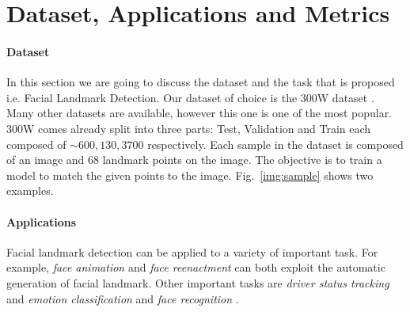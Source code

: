 \section{Dataset, Applications and Metrics}\label{sects:dataset}
\paragraph{Dataset}
In this section we are going to discuss the dataset and the task that is proposed i.e. Facial Landmark Detection. Our dataset of choice is the 300W dataset \cite{Sagonas13a,Sagonas13b,Sagonas16}. Many other datasets are available, however this one is one of the most popular. 300W comes already split into three parts: Test, Validation and Train each composed of $\sim 600,130,3700$ respectively. Each sample in the dataset is composed of an image and 68 landmark points on the image. The objective is to train a model to match the given points to the image. Fig.~\ref{img:sample} shows two examples.

\paragraph{Applications}
Facial landmark detection can be applied to a variety of important task. For example, \textit{face animation} and \textit{face reenactment} can both exploit the automatic generation of facial landmark. Other important tasks are \textit{driver status tracking} and \textit{emotion classification} and \textit{face recognition} \cite{Khabarlak21}.


